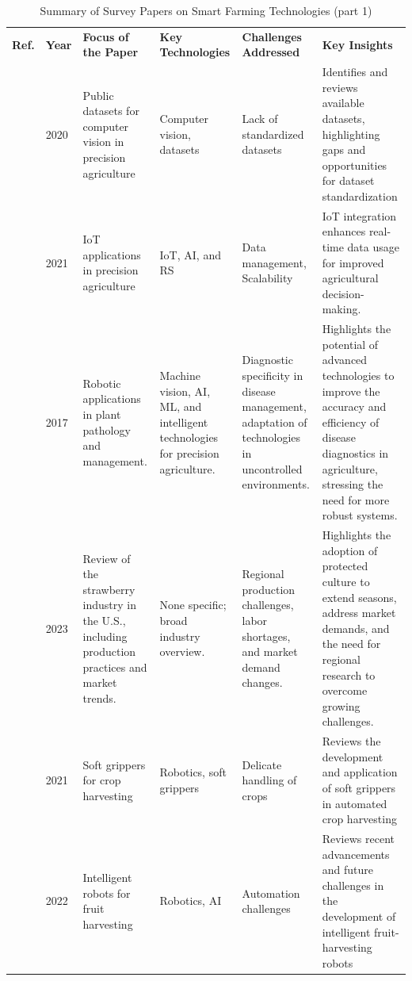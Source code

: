 \documentclass[a4paper,fleqn]{cas-dc}
\begin{document}
\begin{table}[ht]
\scriptsize
\centering
\caption{Summary of Survey Papers on Smart Farming Technologies (part 1)} 
\label{tab:survey_summary}
\begin{tabular} {p{0.4cm}p{0.5cm}p{3cm}p{3.2cm}p{3cm}p{5cm}}
\toprule
\textbf{Ref.} & \textbf{Year} & \textbf{Focus of the Paper} & \textbf{Key Technologies} & \textbf{Challenges Addressed} & \textbf{Key Insights} \\

\cite{lu2020survey} & 2020 & Public datasets for computer vision in precision agriculture & Computer vision, datasets & Lack of standardized datasets & Identifies and reviews available datasets, highlighting gaps and opportunities for dataset standardization \\ \midrule
\cite{mohamed2021smart} & 2021 & IoT applications in precision agriculture & IoT, AI, and RS & Data management, Scalability & IoT integration enhances real-time data usage for improved agricultural decision-making. \\
\midrule
\cite{ampatzidis2017ipathology} & 2017 & Robotic applications in plant pathology and management. & Machine vision, AI, ML, and intelligent technologies for precision agriculture. & Diagnostic specificity in disease management, adaptation of technologies in uncontrolled environments. & Highlights the potential of advanced technologies to improve the accuracy and efficiency of disease diagnostics in agriculture, stressing the need for more robust systems. \\ \midrule
\cite{samtani2019status} & 2023 & Review of the strawberry industry in the U.S., including production practices and market trends. & None specific; broad industry overview. & Regional production challenges, labor shortages, and market demand changes. & Highlights the adoption of protected culture to extend seasons, address market demands, and the need for regional research to overcome growing challenges. \\ \midrule
\cite{navas2021soft} & 2021 & Soft grippers for crop harvesting & Robotics, soft grippers & Delicate handling of crops & Reviews the development and application of soft grippers in automated crop harvesting \\ \midrule
\cite{zhou2022intelligent} & 2022 & Intelligent robots for fruit harvesting & Robotics, AI & Automation challenges & Reviews recent advancements and future challenges in the development of intelligent fruit-harvesting robots \\ \midrule

\end{tabular}
\end{table}
\end{document}
